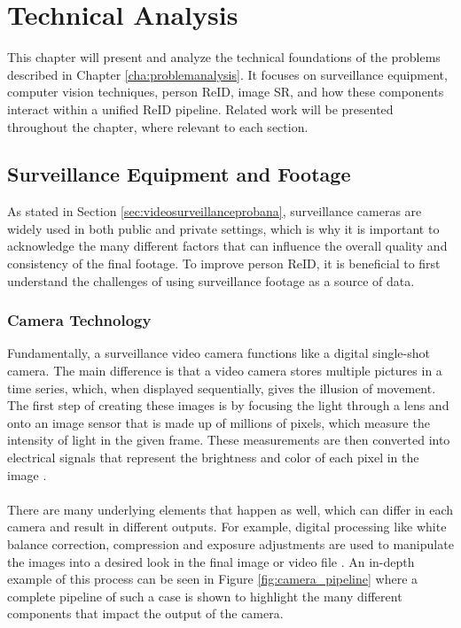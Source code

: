 \chapter{Technical Analysis} \label{cha: technicalanalysis}
This chapter will present and analyze the technical foundations of the problems described in Chapter \ref{cha:problemanalysis}. It focuses on surveillance equipment, computer vision techniques, person \acf{ReID}, image \acf{SR}, and how these components interact within a unified \acs{ReID} pipeline. Related work will be presented throughout the chapter, where relevant to each section.

\section{Surveillance Equipment and Footage}
\label{subsec:Surveillance_equipment_n_footage}
As stated in Section \ref{sec:videosurveillanceprobana}, surveillance cameras are widely used in both public and private settings, which is why it is important to acknowledge the many different factors that can influence the overall quality and consistency of the final footage. To improve person \acs{ReID}, it is beneficial to first understand the challenges of using surveillance footage as a source of data.
 
\subsection{Camera Technology}
\label{subsubsec:How_cameras_work}
Fundamentally, a surveillance video camera functions like a digital single-shot camera. The main difference is that a video camera stores multiple pictures in a time series, which, when displayed sequentially, gives the illusion of movement. The first step of creating these images is by focusing the light through a lens and onto an image sensor that is made up of millions of pixels, which measure the intensity of light in the given frame. These measurements are then converted into electrical signals that represent the brightness and color of each pixel in the image \cite{unc_camera_pipeline, ucocare2024SurvilanceCameraFunction}.
\\\\
There are many underlying elements that happen as well, which can differ in each camera and result in different outputs. For example, digital processing like white balance correction, compression and exposure adjustments are used to manipulate the images into a desired look in the final image or video file \cite{unc_camera_pipeline}.
An in-depth example of this process can be seen in Figure \ref{fig:camera_pipeline} where a complete pipeline of such a case is shown to highlight the many different components that impact the output of the camera.

